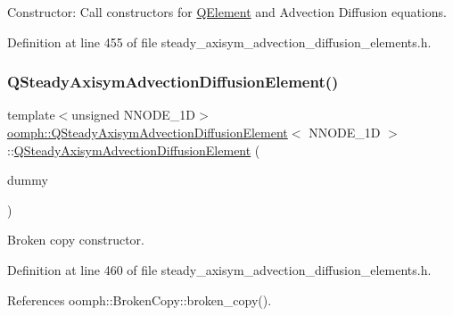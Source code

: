 Constructor\+: Call constructors for \hyperlink{classoomph_1_1QElement}{Q\+Element} and Advection Diffusion equations. 



Definition at line 455 of file steady\+\_\+axisym\+\_\+advection\+\_\+diffusion\+\_\+elements.\+h.

\mbox{\label{classoomph_1_1QSteadyAxisymAdvectionDiffusionElement_a6950503ceccc90efb293e568519e5255}} 
\subsubsection{\texorpdfstring{Q\+Steady\+Axisym\+Advection\+Diffusion\+Element()}{QSteadyAxisymAdvectionDiffusionElement()}\hspace{0.1cm}{\footnotesize\ttfamily [2/2]}}
{\footnotesize\ttfamily template$<$unsigned N\+N\+O\+D\+E\+\_\+1D$>$ \\
\hyperlink{classoomph_1_1QSteadyAxisymAdvectionDiffusionElement}{oomph\+::\+Q\+Steady\+Axisym\+Advection\+Diffusion\+Element}$<$ N\+N\+O\+D\+E\+\_\+1D $>$\+::\hyperlink{classoomph_1_1QSteadyAxisymAdvectionDiffusionElement}{Q\+Steady\+Axisym\+Advection\+Diffusion\+Element} (\begin{DoxyParamCaption}\item[{const \hyperlink{classoomph_1_1QSteadyAxisymAdvectionDiffusionElement}{Q\+Steady\+Axisym\+Advection\+Diffusion\+Element}$<$ N\+N\+O\+D\+E\+\_\+1D $>$ \&}]{dummy }\end{DoxyParamCaption})\hspace{0.3cm}{\ttfamily [inline]}}



Broken copy constructor. 



Definition at line 460 of file steady\+\_\+axisym\+\_\+advection\+\_\+diffusion\+\_\+elements.\+h.



References oomph\+::\+Broken\+Copy\+::broken\+\_\+copy().



